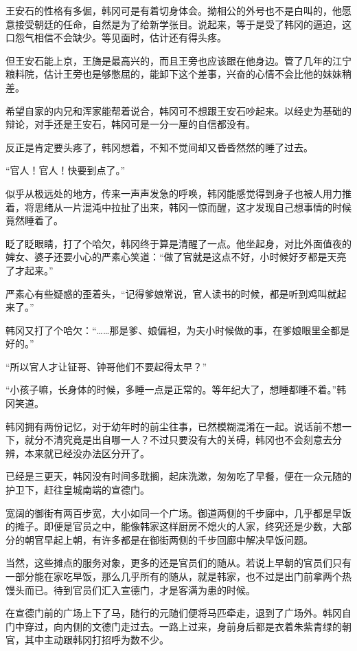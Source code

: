 王安石的性格有多倔，韩冈可是有着切身体会。拗相公的外号也不是白叫的，他愿意接受朝廷的任命，自然是为了给新学张目。说起来，等于是受了韩冈的逼迫，这口怨气相信不会缺少。等见面时，估计还有得头疼。

但王安石能上京，王旖是最高兴的，而且王旁也应该跟在他身边。管了几年的江宁粮料院，估计王旁也是够憋屈的，能卸下这个差事，兴奋的心情不会比他的妹妹稍差。

希望自家的内兄和浑家能帮着说合，韩冈可不想跟王安石吵起来。以经史为基础的辩论，对手还是王安石，韩冈可是一分一厘的自信都没有。

反正是肯定要头疼了，韩冈想着，不知不觉间却又昏昏然然的睡了过去。

“官人！官人！快要到点了。”

似乎从极远处的地方，传来一声声发急的呼唤，韩冈能感觉得到身子也被人用力推着，将思绪从一片混沌中拉扯了出来，韩冈一惊而醒，这才发现自己想事情的时候竟然睡着了。

眨了眨眼睛，打了个哈欠，韩冈终于算是清醒了一点。他坐起身，对比外面值夜的婢女、婆子还要小心的严素心笑道：“做了官就是这点不好，小时候好歹都是天亮了才起来。”

严素心有些疑惑的歪着头，“记得爹娘常说，官人读书的时候，都是听到鸡叫就起来了。”

韩冈又打了个哈欠：“……那是爹、娘偏袒，为夫小时候做的事，在爹娘眼里全都是好的。”

“所以官人才让钲哥、钟哥他们不要起得太早？”

“小孩子嘛，长身体的时候，多睡一点是正常的。等年纪大了，想睡都睡不着。”韩冈笑道。

韩冈拥有两份记忆，对于幼年时的前尘往事，已然模糊混淆在一起。说话前不想一下，就分不清究竟是出自哪一人？不过只要没有大的关碍，韩冈也不会刻意去分辨，本来就已经没办法区分开了。

已经是三更天，韩冈没有时间多耽搁，起床洗漱，匆匆吃了早餐，便在一众元随的护卫下，赶往皇城南端的宣德门。

宽阔的御街有两百步宽，大小如同一个广场。御道两侧的千步廊中，几乎都是早饭的摊子。即便是官员之中，能像韩家这样厨房不熄火的人家，终究还是少数，大部分的朝官早起上朝，有许多都是在御街两侧的千步回廊中解决早饭问题。

当然，这些摊点的服务对象，更多的还是官员们的随从。若说上早朝的官员们只有一部分能在家吃早饭，那么几乎所有的随从，就是韩家，也不过是出门前拿两个热馒头而已。待到官员们汇入宣德门，才是客满为患的时候。

在宣德门前的广场上下了马，随行的元随们便将马匹牵走，退到了广场外。韩冈自门中穿过，向内侧的文德门走过去。一路上过来，身前身后都是衣着朱紫青绿的朝官，其中主动跟韩冈打招呼为数不少。

